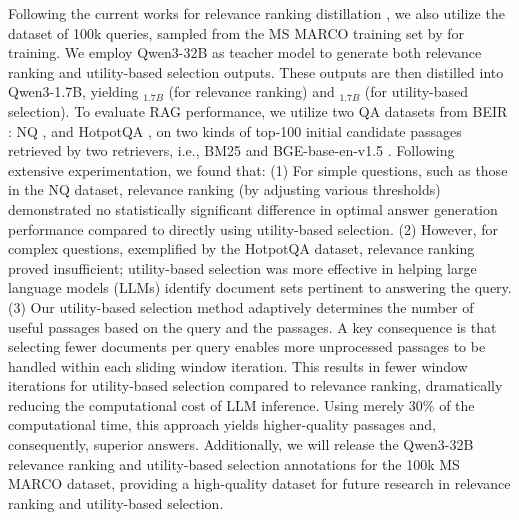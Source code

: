 Following the current works for relevance ranking distillation \cite{sun2023chatgpt, pradeep2023rankzephyr,liu2025leveraging}, we also utilize the dataset of 100k queries, sampled from the MS MARCO training set by \cite{sun2023chatgpt} for training. 
We employ Qwen3-32B \cite{qwen3technicalreport} as teacher model to generate both relevance ranking and utility-based selection outputs. 
These outputs are then distilled into Qwen3-1.7B, yielding \rank$_{1.7B}$ (for relevance ranking) and \utility$_{1.7B}$ (for utility-based selection). 
To evaluate RAG performance, we utilize two QA datasets from BEIR \cite{thakur2021beir}: NQ \cite{kwiatkowski2019natural}, and HotpotQA \cite{yang2018hotpotqa}, on two kinds of top-100 initial candidate passages retrieved by two retrievers, i.e., BM25 \cite{robertson2009probabilistic} and BGE-base-en-v1.5 \cite{bge_embedding}.   
Following extensive experimentation, we found that:
(1) For simple questions, such as those in the NQ dataset, relevance ranking (by adjusting various thresholds) demonstrated no statistically significant difference in optimal answer generation performance compared to directly using utility-based selection.
(2) However, for complex questions, exemplified by the HotpotQA dataset, relevance ranking proved insufficient; utility-based selection was more effective in helping large language models (LLMs) identify document sets pertinent to answering the query.
(3) Our utility-based selection method adaptively determines the number of useful passages based on the query and the passages. 
A key consequence is that selecting fewer documents per query enables more unprocessed passages to be handled within each sliding window iteration. 
This results in fewer window iterations for utility-based selection compared to relevance ranking, dramatically reducing the computational cost of LLM inference. 
Using merely 30\% of the computational time, this approach yields higher-quality passages and, consequently, superior answers. 
Additionally, we will release the Qwen3-32B relevance ranking and utility-based selection annotations for the 100k MS MARCO dataset, providing a high-quality dataset for future research in relevance ranking and utility-based selection. 





